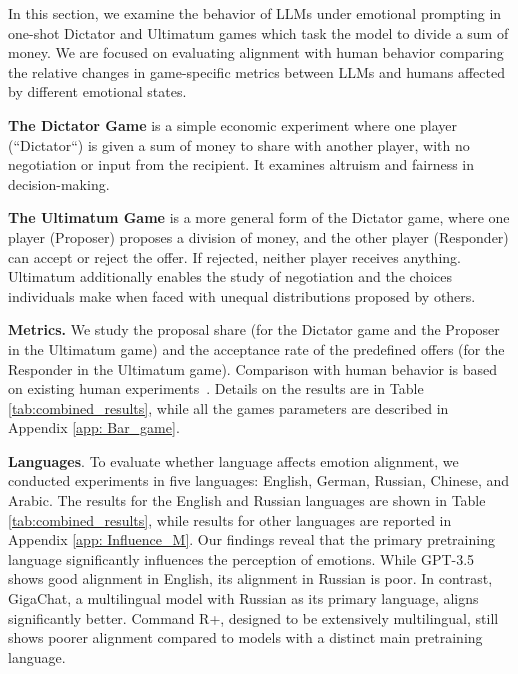 \documentclass{article}
\begin{document}
In this section, we examine the behavior of LLMs under emotional prompting in one-shot Dictator and Ultimatum games which task the model to divide a sum of money. We are focused on evaluating alignment with human behavior comparing the relative changes in game-specific metrics between LLMs and humans affected by different emotional states.%


\textbf{The Dictator Game} is a simple economic experiment where one player (``Dictator``) is given a sum of money to share with another player, with no negotiation or input from the recipient. It examines altruism and fairness in decision-making.

\textbf{The Ultimatum Game} is a more general form of the Dictator game, where one player (Proposer) proposes a division of money, and the other player (Responder) can accept or reject the offer. If rejected, neither player receives anything. %
Ultimatum additionally enables the study of negotiation and the choices individuals make when faced with unequal distributions proposed by others.

\textbf{Metrics.} We study the proposal share (for the Dictator game and the Proposer in the Ultimatum game) and the acceptance rate of the predefined offers (for the Responder in the Ultimatum game). Comparison with human behavior is based on existing human experiments~\cite{kahn8519b346-8909-36b4-80bc-495f40d2483f, engelRePEc:mpg:wpaper:2010_07,hoffRePEc:spr:jogath:v:25:y:1996:i:3:p:289-301,LARNEY201961}. Details on the results are in Table \ref{tab:combined_results}, while all the games parameters are described in Appendix \ref{app: Bar_game}.

\textbf{Languages}. To evaluate whether language affects emotion alignment, we conducted experiments in five languages: English, German, Russian, Chinese, and Arabic. The results for the English and Russian languages are shown in Table \ref{tab:combined_results}, while results for other languages are reported in Appendix \ref{app: Influence_M}. Our findings reveal that the primary pretraining language significantly influences the perception of emotions. While GPT-3.5 shows good alignment in English, its alignment in Russian is poor. In contrast, GigaChat, a multilingual model with Russian as its primary language, aligns significantly better. Command R+, designed to be extensively multilingual, still shows poorer alignment compared to models with a distinct main pretraining language.
\end{document}
